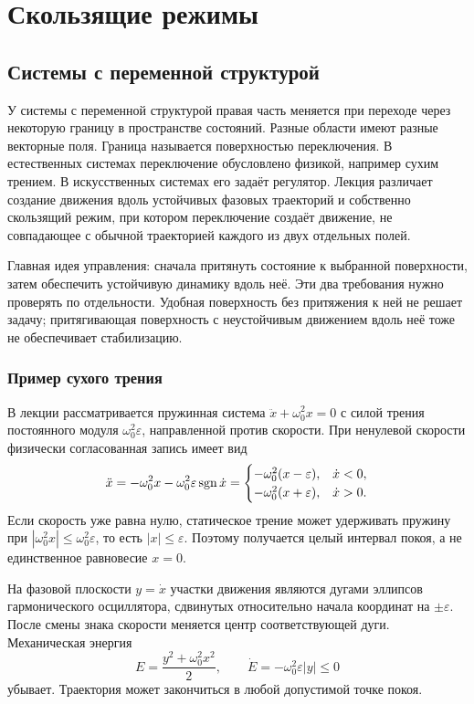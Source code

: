 \section{Скользящие режимы}
\label{sec:sliding}

\subsection{Системы с переменной структурой}

У системы с переменной структурой правая часть меняется при переходе через
некоторую границу в пространстве состояний. Разные области имеют разные
векторные поля. Граница называется поверхностью переключения. В естественных
системах переключение обусловлено физикой, например сухим трением.
В искусственных системах его задаёт регулятор. Лекция различает создание
движения вдоль устойчивых фазовых траекторий и собственно скользящий режим,
при котором переключение создаёт движение, не совпадающее с обычной
траекторией каждого из двух отдельных полей.

Главная идея управления: сначала притянуть состояние к выбранной поверхности,
затем обеспечить устойчивую динамику вдоль неё. Эти два требования нужно
проверять по отдельности. Удобная поверхность без притяжения к ней не решает
задачу; притягивающая поверхность с неустойчивым движением вдоль неё тоже
не обеспечивает стабилизацию.

\subsubsection{Пример сухого трения}

В лекции рассматривается пружинная система $\ddot x+\omega_0^2x=0$
с силой трения постоянного модуля $\omega_0^2\varepsilon$, направленной
против скорости. При ненулевой скорости физически согласованная запись имеет
вид
\[
 \ddot x=-\omega_0^2x-\omega_0^2\varepsilon\operatorname{sgn}\dot x
 =\begin{cases}
  -\omega_0^2(x-\varepsilon),&\dot x<0,\\
  -\omega_0^2(x+\varepsilon),&\dot x>0.
 \end{cases}
\]
Если скорость уже равна нулю, статическое трение может удерживать пружину
при $|\omega_0^2x|\le\omega_0^2\varepsilon$, то есть $|x|\le\varepsilon$.
Поэтому получается целый интервал покоя, а не единственное равновесие $x=0$.

На фазовой плоскости $y=\dot x$ участки движения являются дугами эллипсов
гармонического осциллятора, сдвинутых относительно начала координат на
$\pm\varepsilon$. После смены знака скорости меняется центр соответствующей
дуги. Механическая энергия
\[
 E=\frac{y^2+\omega_0^2x^2}{2},\qquad
 \dot E=-\omega_0^2\varepsilon|y|\le0
\]
убывает. Траектория может закончиться в любой допустимой точке покоя.

